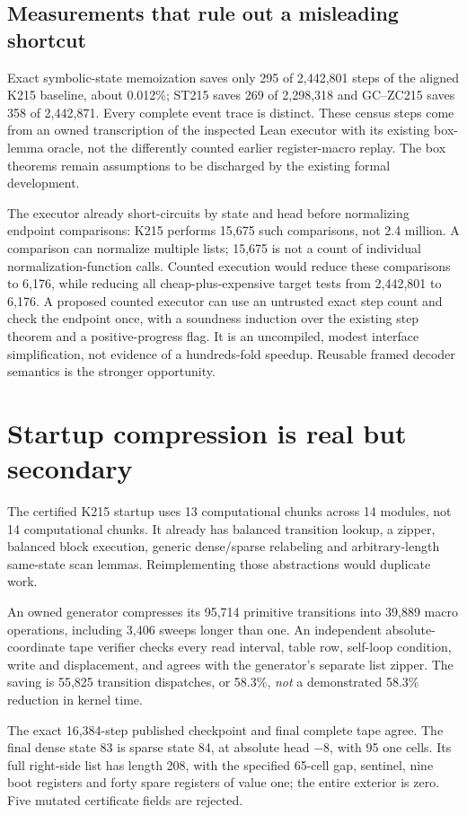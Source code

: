 \documentclass[11pt]{article}
\begin{document}
\subsection{Measurements that rule out a misleading shortcut}
Exact symbolic-state memoization saves only 295 of 2,442,801 steps of the aligned K215 baseline, about 0.012\%; ST215 saves 269 of 2,298,318 and GC--ZC215 saves 358 of 2,442,871. Every complete event trace is distinct. These census steps come from an owned transcription of the inspected Lean executor with its existing box-lemma oracle, not the differently counted earlier register-macro replay. The box theorems remain assumptions to be discharged by the existing formal development.

The executor already short-circuits by state and head before normalizing endpoint comparisons: K215 performs 15,675 such comparisons, not 2.4 million. A comparison can normalize multiple lists; 15,675 is not a count of individual normalization-function calls. Counted execution would reduce these comparisons to 6,176, while reducing all cheap-plus-expensive target tests from 2,442,801 to 6,176. A proposed counted executor can use an untrusted exact step count and check the endpoint once, with a soundness induction over the existing step theorem and a positive-progress flag. It is an uncompiled, modest interface simplification, not evidence of a hundreds-fold speedup. Reusable framed decoder semantics is the stronger opportunity.

\section{Startup compression is real but secondary}
The certified K215 startup uses 13 computational chunks across 14 modules, not 14 computational chunks. It already has balanced transition lookup, a zipper, balanced block execution, generic dense/sparse relabeling and arbitrary-length same-state scan lemmas. Reimplementing those abstractions would duplicate work.

An owned generator compresses its 95,714 primitive transitions into 39,889 macro operations, including 3,406 sweeps longer than one. An independent absolute-coordinate tape verifier checks every read interval, table row, self-loop condition, write and displacement, and agrees with the generator's separate list zipper. The saving is 55,825 transition dispatches, or 58.3\%, \emph{not} a demonstrated 58.3\% reduction in kernel time.

The exact 16,384-step published checkpoint and final complete tape agree. The final dense state 83 is sparse state 84, at absolute head $-8$, with 95 one cells. Its full right-side list has length 208, with the specified 65-cell gap, sentinel, nine boot registers and forty spare registers of value one; the entire exterior is zero. Five mutated certificate fields are rejected.
\end{document}
